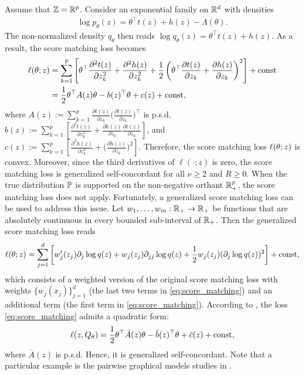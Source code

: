 \begin{example}
    Assume that $\mathbb{Z} = {\mathbb R}^p$.
    Consider an exponential family on ${\mathbb R}^d$ with densities
    \begin{align*}
        \log{p_\theta(z)} = \theta^\top t(z) + h(z) - \Lambda(\theta).
    \end{align*}
    The non-normalized density $q_\theta$ then reads $\log{q_\theta(z)} = \theta^\top t(z) + h(z)$.
    As a result, the score matching loss becomes
    \begin{align*}
        \ell(\theta; z) &= \sum_{k=1}^p \left[ \theta^\top \frac{\partial^2 t(z)}{\partial z_k^2} + \frac{\partial^2 h(z)}{\partial z_k^2} + \frac12 \left( \theta^\top \frac{\partial t(z)}{\partial z_k} + \frac{\partial h(z)}{\partial z_k} \right)^2 \right] + \text{const} \\
        &= \frac12 \theta^\top A(z) \theta - b(z)^\top \theta + c(z) + \text{const},
    \end{align*}
    where $A(z) := \sum_{k=1}^p \frac{\partial t(z)}{\partial z_k} \big(\frac{\partial t(z)}{\partial z_k}\big)^\top$ is p.s.d, $b(z) := \sum_{k=1}^p \left[ \frac{\partial^2 t(z)}{\partial z_k^2} + \frac{\partial h(z)}{\partial z_k} \frac{\partial t(z)}{\partial z_k} \right]$, and $c(z) := \sum_{k=1}^p \left[ \frac{\partial^2 h(z)}{\partial z_k^2} + \big(\frac{\partial h(z)}{\partial z_k}\big)^2 \right]$.
    Therefore, the score matching loss $\ell(\theta; z)$ is convex.
    Moreover, since the third derivatives of $\ell(\cdot; z)$ is zero, the score matching loss is generalized self-concordant for all $\nu \ge 2$ and $R \ge 0$.
    When the true distribution $\operatorname{\mathbb P}$ is supported on the non-negative orthant ${\mathbb R}^p_+$, the score matching loss does not apply.
    Fortunately, a generalized score matching \citep{hyvarinen2007some,yu2019generalized} loss can be used to address this issue.
    Let $w_1, \dots, w_m: {\mathbb R}_+ \to {\mathbb R}_+$ be functions that are absolutely continuous in every bounded sub-interval of ${\mathbb R}_+$.
    Then the generalized score matching loss reads
    \begin{align}\label{eq:score_matching}
        \ell(\theta; z) = \sum_{j=1}^d \left[ w_j'(z_j) \partial_j \log{q(z)} + w_j(z_j) \partial_{jj} \log{q(z)} + \frac12 w_j(z_j) (\partial_j \log{q(z)})^2 \right] + \text{const},
    \end{align}
    which consists of a weighted version of the original score matching loss with weights $\{w_j(x_j)\}_{j=1}^d$ (the last two terms in \eqref{eq:score_matching}) and an additional term (the first term in \eqref{eq:score_matching}).
    According to \cite[Theorem 5]{yu2019generalized}, the loss \eqref{eq:score_matching} admits a quadratic form:
    \begin{align*}
        \ell(z, Q_\theta) = \frac12 \theta^\top \bar A(z) \theta - \bar b(z)^\top \theta + \bar c(z) + \text{const},
    \end{align*}
    where $\bar A(z)$ is p.s.d.
    Hence, it is generalized self-concordant.
    Note that a particular example is the pairwise graphical models studies in \citep{yu2016statistical,yu2020simultaneous}.
\end{example}

